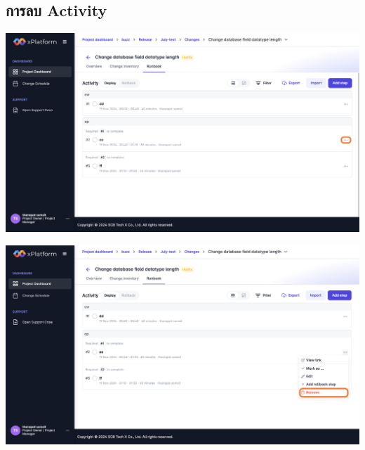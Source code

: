 \subsection{การลบ Activity}
\begin{center}
    \includegraphics[width=\linewidth]{resources/pages/change-runbook/delete-activity/41.png}
    
    \vspace{1in}
    
    \includegraphics[width=\linewidth]{resources/pages/change-runbook/delete-activity/42.png}
\end{center}
    

